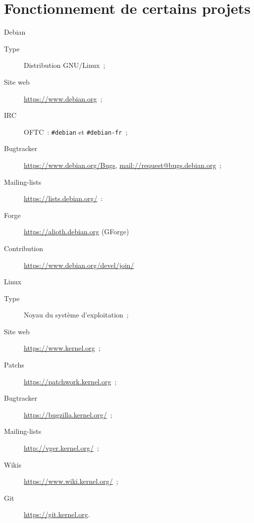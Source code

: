 \section{Fonctionnement de certains projets}

\begin{frame}[fragile]{Debian}
\begin{description}
 \item [Type] Distribution GNU/Linux~;
 \item [Site web] \url{https://www.debian.org}~;
 \item [IRC] OFTC~: \verb/#debian/ et \verb/#debian-fr/~;
 \item [Bugtracker] \url{https://www.debian.org/Bugs}, \url{mail://request@bugs.debian.org}~;
 \item [Mailing-lists] \url{https://lists.debian.org/}~:
 \item [Forge] \url{https://alioth.debian.org} (GForge)
 \item [Contribution] \url{https://www.debian.org/devel/join/}
\end{description}
\end{frame}

\begin{frame}[fragile]{Linux}
 \begin{description}
  \item [Type] Noyau du système d'exploitation~;
  \item [Site web] \url{https://www.kernel.org}~;
  \item [Patchs] \url{https://patchwork.kernel.org}~;
  \item [Bugtracker] \url{https://bugzilla.kernel.org/}~;
  \item [Mailing-lists] \url{http://vger.kernel.org/}~;
  \item [Wikis] \url{https://www.wiki.kernel.org/}~;
  \item [Git] \url{https://git.kernel.org}.
 \end{description}
\end{frame}

